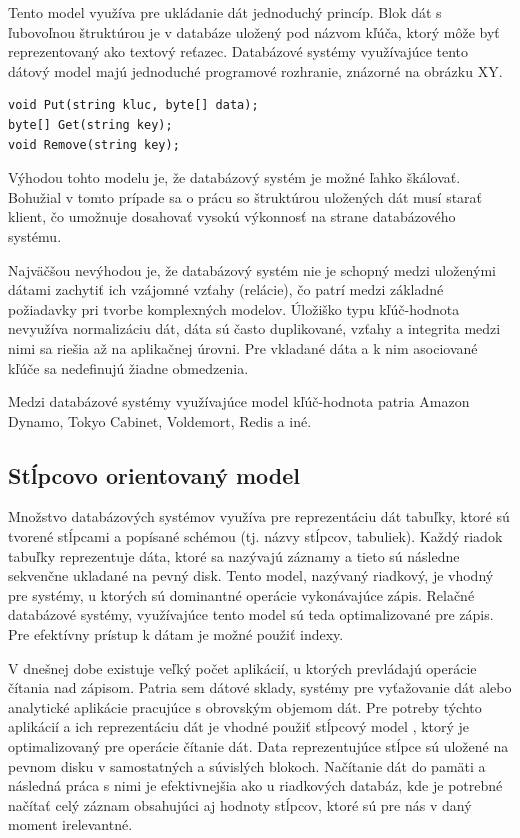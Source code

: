 \documentclass[11pt,twoside,a4paper]{book}
\begin{document}
Tento model využíva pre ukládanie dát jednoduchý princíp. Blok dát s ľubovoľnou štruktúrou je v databáze uložený pod názvom kľúča, ktorý môže byť reprezentovaný ako textový reťazec. Databázové systémy využívajúce tento dátový model majú jednoduché programové rozhranie, znázorné na obrázku XY.

\begin{verbatim}
void Put(string kluc, byte[] data);
byte[] Get(string key);
void Remove(string key);
\end{verbatim}


Výhodou tohto modelu je, že databázový systém je možné ľahko škálovať. Bohužial v tomto prípade sa o prácu so štruktúrou uložených dát musí starať klient, čo umožnuje dosahovať vysokú výkonnosť na strane databázového systému.

Najväčšou nevýhodou je, že databázový systém nie je schopný medzi uloženými dátami zachytiť ich vzájomné vzťahy (relácie), čo patrí medzi základné požiadavky pri tvorbe komplexných modelov. Úložiško typu kľúč-hodnota nevyužíva normalizáciu dát, dáta sú často duplikované, vzťahy a integrita medzi nimi sa riešia až na aplikačnej úrovni. Pre vkladané dáta a k nim asociované kľúče sa nedefinujú žiadne obmedzenia.

Medzi databázové systémy využívajúce model kľúč-hodnota patria Amazon Dynamo, Tokyo Cabinet, Voldemort, Redis a iné.

\subsection{Stĺpcovo orientovaný model}

Množstvo databázových systémov využíva pre reprezentáciu dát tabuľky, ktoré sú tvorené stĺpcami a popísané schémou (tj. názvy stĺpcov, tabuliek). Každý riadok tabuľky reprezentuje dáta, ktoré sa nazývajú záznamy a tieto sú následne sekvenčne ukladané na pevný disk. Tento model, nazývaný riadkový, je vhodný pre systémy, u ktorých sú dominantné operácie vykonávajúce zápis. Relačné databázové systémy, využívajúce tento model sú teda optimalizované pre zápis. Pre efektívny prístup k dátam je možné použiť indexy.

V dnešnej dobe existuje veľký počet aplikácií, u ktorých prevládajú operácie čítania nad zápisom. Patria sem dátové sklady, systémy pre vyťažovanie dát alebo analytické aplikácie pracujúce s obrovským objemom dát. Pre potreby týchto aplikácií a ich reprezentáciu dát je vhodné použiť stĺpcový model \cite{abadi2009column}\cite{abadi2009}, ktorý je optimalizovaný pre operácie čítanie dát. Data reprezentujúce stĺpce sú uložené na pevnom disku v samostatných a súvislých blokoch. Načítanie dát do pamäti a následná práca s nimi je efektivnejšia ako u riadkových databáz, kde je potrebné načítať celý záznam obsahujúci aj hodnoty stĺpcov, ktoré sú pre nás v daný moment irelevantné.
\end{document}
